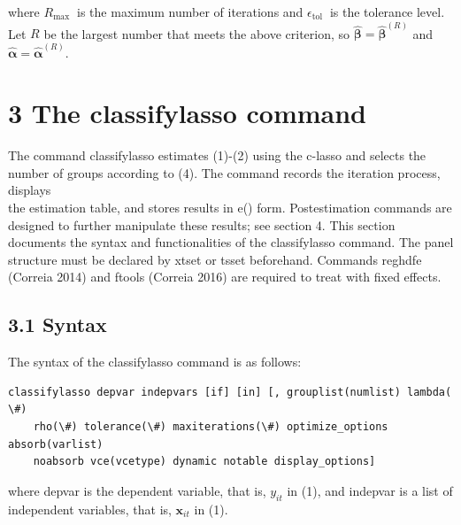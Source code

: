\documentclass[10pt]{article}
\begin{document}
where $R_{\text {max }}$ is the maximum number of iterations and $\epsilon_{\text {tol }}$ is the tolerance level. Let $R$ be the largest number that meets the above criterion, so $\widehat{\boldsymbol{\beta}}=\widehat{\boldsymbol{\beta}}^{(R)}$ and $\widehat{\boldsymbol{\alpha}}=\widehat{\boldsymbol{\alpha}}^{(R)}$.

\section*{3 The classifylasso command}
The command classifylasso estimates (1)-(2) using the c-lasso and selects the number of groups according to (4). The command records the iteration process, displays\\
the estimation table, and stores results in e() form. Postestimation commands are designed to further manipulate these results; see section 4. This section documents the syntax and functionalities of the classifylasso command. The panel structure must be declared by xtset or tsset beforehand. Commands reghdfe (Correia 2014) and ftools (Correia 2016) are required to treat with fixed effects.

\subsection*{3.1 Syntax}
The syntax of the classifylasso command is as follows:

\begin{verbatim}
classifylasso depvar indepvars [if] [in] [, grouplist(numlist) lambda( \#)
    rho(\#) tolerance(\#) maxiterations(\#) optimize_options absorb(varlist)
    noabsorb vce(vcetype) dynamic notable display_options]
\end{verbatim}

where depvar is the dependent variable, that is, $y_{i t}$ in (1), and indepvar is a list of independent variables, that is, $\mathbf{x}_{i t}$ in (1).
\end{document}
